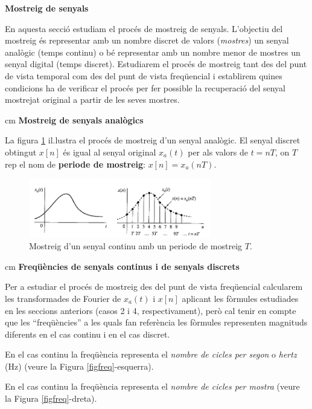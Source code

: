 \documentclass{article}
\begin{document}
\newpage
\textbf{\large Mostreig de senyals}

En aquesta secci\'o estudiam el proc\'es de mostreig de senyals. L'objectiu del mostreig
\'es representar amb un nombre discret de valors (\textit{mostres}) un senyal anal\`ogic (temps continu)
o b\'e representar amb un nombre menor de mostres un senyal digital (temps discret).
Estudiarem el proc\'es de mostreig tant des del punt de vista temporal com des del punt de vista freq\"uencial
i establirem quines condicions ha de verificar el proc\'es per fer possible la recuperaci\'o del senyal
mostrejat original a partir de les seves mostres.


 cm
\noindent
\textbf{Mostreig de senyals anal\`ogics}

La figura \ref{figmostreig} il.lustra el proc\'es de mostreig d'un senyal anal\`ogic. El senyal discret obtingut
$x[n]$ \'es igual al senyal original $x_a(t)$ per als valors de $t=nT$, on $T$ rep el nom de \textbf{periode de
mostreig}: $x[n]=x_a(nT)$.

\begin{figure}[htbp]
\begin{center}
\includegraphics[width=8cm]{figmostreig.png}
\end{center}
\caption{Mostreig d'un senyal continu amb un periode de mostreig $T$.}
\label{figmostreig}
\end{figure}

 cm
\noindent
\textbf{Freq\"u\`encies de senyals continus i de senyals discrets}

Per a estudiar el proc\'es de mostreig des del punt de vista freq\"uencial calcularem les transformades de
Fourier de $x_a(t)$ i $x[n]$ aplicant les f\`ormules estudiades en les seccions anteriors (casos 2 i 4, respectivament),
per\`o cal tenir en compte que les ``freq\"u\`encies'' a les quals fan refer\`encia les f\`ormules representen
magnituds diferents en el cas continu i en el cas discret.

En el cas continu la freq\"u\`encia representa el \textit{nombre de cicles per segon} o \textit{hertz} (Hz) (veure la 
Figura \ref{figfreq}-esquerra).


En el cas continu la freq\"u\`encia representa el \textit{nombre de cicles per mostra} (veure la 
Figura \ref{figfreq}-dreta).
\end{document}
